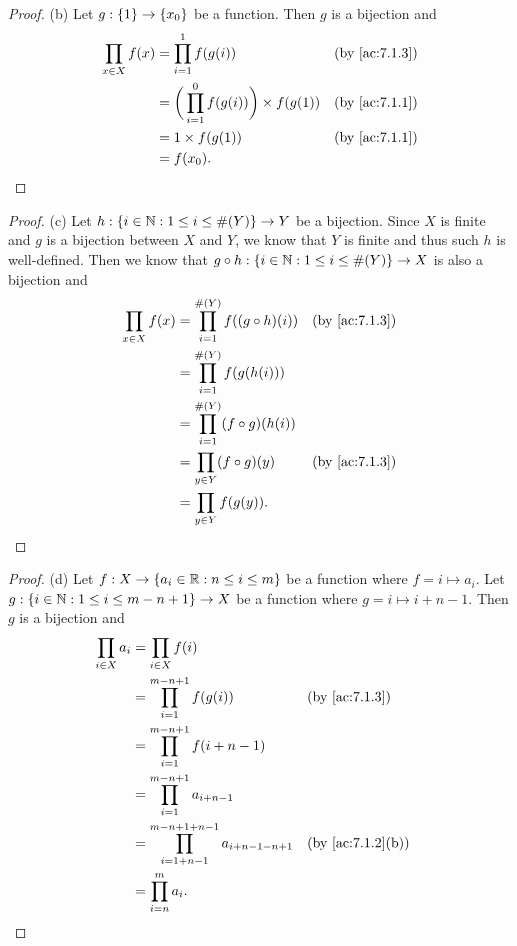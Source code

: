\begin{proof}{(b)}
  Let \(g : \left\lbrace1\right\rbrace \to \left\lbrace x_0\right\rbrace\) be a function.
  Then \(g\) is a bijection and
  \begin{align*}
    \prod_{x \in X} f(x) & = \prod_{i = 1}^1 f(g(i))                            &  & \by{ac:7.1.3} \\
                         & = \bigg(\prod_{i = 1}^0 f(g(i))\bigg) \times f(g(1)) &  & \by{ac:7.1.1} \\
                         & = 1 \times f(g(1))                                   &  & \by{ac:7.1.1} \\
                         & = f(x_0).
  \end{align*}
\end{proof}

\begin{proof}{(c)}
  Let \(h : \left\lbrace i \in \mathbb{N} : 1 \leq i \leq \#(Y)\right\rbrace \to Y\) be a bijection.
  Since \(X\) is finite and \(g\) is a bijection between \(X\) and \(Y\), we know that \(Y\) is finite and thus such \(h\) is well-defined.
  Then we know that \(g \circ h : \left\lbrace i \in \mathbb{N} : 1 \leq i \leq \#(Y)\right\rbrace \to X\) is also a bijection and
  \begin{align*}
    \prod_{x \in X} f(x) & = \prod_{i = 1}^{\#(Y)} f((g \circ h)(i)) &  & \by{ac:7.1.3} \\
                         & = \prod_{i = 1}^{\#(Y)} f(g(h(i)))                           \\
                         & = \prod_{i = 1}^{\#(Y)} (f \circ g)(h(i))                    \\
                         & = \prod_{y \in Y} (f \circ g)(y)          &  & \by{ac:7.1.3} \\
                         & = \prod_{y \in Y} f(g(y)).
  \end{align*}
\end{proof}

\begin{proof}{(d)}
  Let \(f : X \to \left\lbrace a_i \in \mathbb{R} : n \leq i \leq m\right\rbrace\) be a function where \(f = i \mapsto a_i\).
  Let \(g : \left\lbrace i \in \mathbb{N} : 1 \leq i \leq m - n + 1\right\rbrace \to X\) be a function where \(g = i \mapsto i + n - 1\).
  Then \(g\) is a bijection and
  \begin{align*}
    \prod_{i \in X} a_i & = \prod_{i \in X} f(i)                                                                  \\
                        & = \prod_{i = 1}^{m - n + 1} f(g(i))                               &  & \by{ac:7.1.3}    \\
                        & = \prod_{i = 1}^{m - n + 1} f(i + n - 1)                                                \\
                        & = \prod_{i = 1}^{m - n + 1} a_{i + n - 1}                                               \\
                        & = \prod_{i = 1 + n - 1}^{m - n + 1 + n - 1} a_{i + n - 1 - n + 1} &  & \by{ac:7.1.2}[b] \\
                        & = \prod_{i = n}^m a_i.
  \end{align*}
\end{proof}

